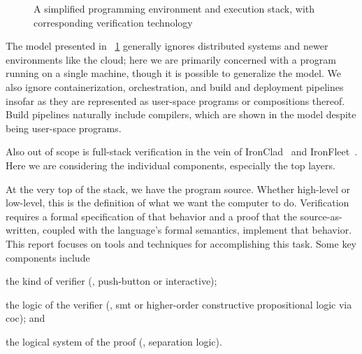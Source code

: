 \begin{figure}[ht]
    \centering
    \caption{A simplified programming environment and execution stack, with corresponding verification technology}\label{F:abstraction}
\end{figure}

The model presented in \figurename~\ref{F:abstraction} generally ignores
distributed systems and newer environments like the cloud; here we are primarily
concerned with a program running on a single machine, though it is possible to
generalize the model. We also ignore containerization, orchestration, and build
and deployment pipelines insofar as they are represented as user-space programs
or compositions thereof. Build pipelines naturally include compilers, which are
shown in the model despite being user-space programs.

Also out of scope is full-stack verification in the vein of
IronClad~\cite{hawblitzel2014ironclad} and
IronFleet~\cite{hawblitzel2015ironfleet}. Here we are considering the individual
components, especially the top layers.

At the very top of the stack, we have the program source. Whether high-level or
low-level, this is the definition of what we want the computer to do.
Verification requires a formal specification of that behavior and a proof that
the source-as-written, coupled with the language's formal semantics, implement
that behavior. This report focuses on tools and techniques for accomplishing
this task. Some key components include
\begin{inlist}
\item the kind of verifier (\eg, push-button or interactive);
\item the logic of the verifier (\eg, \gls{smt} or higher-order constructive
    propositional logic via \gls{coc}); and
\item the logical system of the proof (\eg, separation logic).
\end{inlist}

